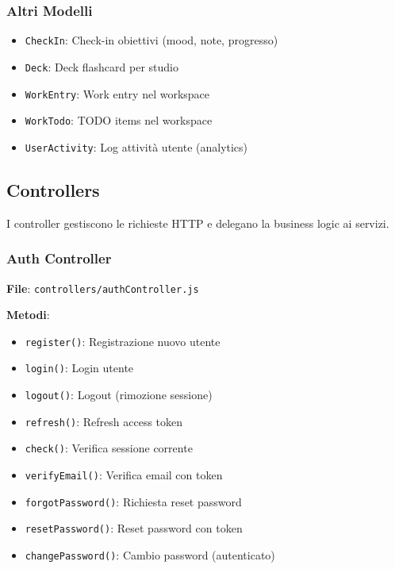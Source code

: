 \documentclass[11pt,a4paper]{article}
\begin{document}
\subsubsection{Altri Modelli}

\begin{itemize}
    \item \texttt{CheckIn}: Check-in obiettivi (mood, note, progresso)
    \item \texttt{Deck}: Deck flashcard per studio
    \item \texttt{WorkEntry}: Work entry nel workspace
    \item \texttt{WorkTodo}: TODO items nel workspace
    \item \texttt{UserActivity}: Log attività utente (analytics)
\end{itemize}

\subsection{Controllers}

I controller gestiscono le richieste HTTP e delegano la business logic ai servizi.

\subsubsection{Auth Controller}

\textbf{File}: \texttt{controllers/authController.js}

\textbf{Metodi}:
\begin{itemize}
    \item \texttt{register()}: Registrazione nuovo utente
    \item \texttt{login()}: Login utente
    \item \texttt{logout()}: Logout (rimozione sessione)
    \item \texttt{refresh()}: Refresh access token
    \item \texttt{check()}: Verifica sessione corrente
    \item \texttt{verifyEmail()}: Verifica email con token
    \item \texttt{forgotPassword()}: Richiesta reset password
    \item \texttt{resetPassword()}: Reset password con token
    \item \texttt{changePassword()}: Cambio password (autenticato)
\end{itemize}
\end{document}
